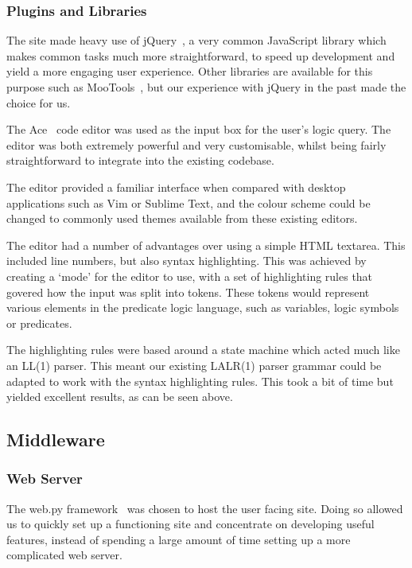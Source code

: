 \documentclass[a4paper, 11pt]{article}
\begin{document}
    \subsubsection{Plugins and Libraries}
      The site made heavy use of jQuery~\cite{jquery}, a very common JavaScript
      library which makes common tasks much more straightforward, to speed up
      development and yield a more engaging user experience. Other libraries are
      available for this purpose such as MooTools~\cite{mootools}, but our
      experience with jQuery in the past made the choice for us.

      The Ace~\cite{aceEditor} code editor was used as the input box for the
      user's logic query. The editor was both extremely powerful and very
      customisable, whilst being fairly straightforward to integrate into the
      existing codebase.

      The editor provided a familiar interface when compared with desktop
      applications such as Vim or Sublime Text, and the colour scheme could be
      changed to commonly used themes available from these existing editors.

      The editor had a number of advantages over using a simple HTML textarea.
      This included line numbers, but also syntax highlighting. This was
      achieved by creating a `mode' for the editor to use, with a set of
      highlighting rules that govered how the input was split into tokens. These
      tokens would represent various elements in the predicate logic language,
      such as variables, logic symbols or predicates.

      The highlighting rules were based around a state machine which acted much
      like an LL(1) parser. This meant our existing LALR(1) parser grammar could
      be adapted to work with the syntax highlighting rules. This took a bit of
      time but yielded excellent results, as can be seen above.

  \subsection{Middleware}
    \subsubsection{Web Server}
      The web.py framework~\cite{webpy} was chosen to host the user facing site.
      Doing so allowed us to quickly set up a functioning site and concentrate
      on developing useful features, instead of spending a large amount of time
      setting up a more complicated web server.
\end{document}

